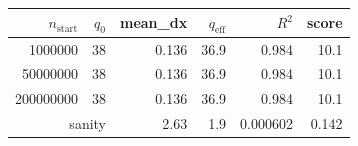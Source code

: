 \begin{tabular}{r r r r r r}
\hline
$n_{\mathrm{start}}$ & $q_0$ & mean\_dx & $q_{\mathrm{eff}}$ & $R^2$ & score \\
\hline
1000000 & 38 & 0.136 & 36.9 & 0.984 & 10.1 \\
\hline
50000000 & 38 & 0.136 & 36.9 & 0.984 & 10.1 \\
\hline
200000000 & 38 & 0.136 & 36.9 & 0.984 & 10.1 \\
\multicolumn{2}{r}{sanity} & 2.63 & 1.9 & 0.000602 & 0.142 \\
\hline
\end{tabular}
